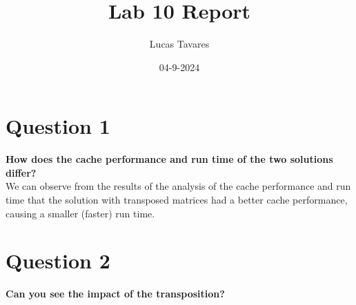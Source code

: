 \documentclass{article}
\title{Lab 10 Report}
\date{04-9-2024}
\author{Lucas Tavares}
\begin{document}
\maketitle


\newpage


\section{Question 1}

\textbf{How does the cache performance and run time of the two solutions differ?} \\




We can observe from the results of the analysis of the cache performance and run time that the solution with transposed matrices had a better cache performance, causing a smaller (faster) run time. \\


\section{Question 2}

\textbf{Can you see the impact of the transposition?} \\

\end{document}
